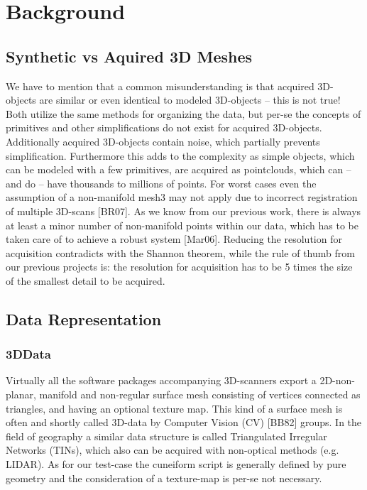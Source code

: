 \documentclass[openany]{book}
\begin{document}
\chapter{Background}
\section{Synthetic vs Aquired 3D Meshes}
We have to mention that a common misunderstanding is that acquired 3D-objects
are similar or even identical to modeled 3D-objects – this is not true! 
Both utilize the same methods for organizing the data, but per-se the concepts 
of primitives and other simplifications do not exist for acquired 3D-objects. 
Additionally acquired 3D-objects contain noise, which partially prevents 
simplification. Furthermore this adds to the complexity as simple objects, 
which can be modeled with a few primitives, are acquired as pointclouds, which 
can – and do – have thousands to millions of points. For worst cases even the 
assumption of a non-manifold mesh3 may not apply due to incorrect registration 
of multiple 3D-scans [BR07]. As we know from our previous work, there is always 
at least a minor number of non-manifold points within our data, which has to be 
taken care of to achieve a robust system [Mar06]. Reducing the resolution for 
acquisition contradicts with the Shannon theorem, while the rule of thumb from 
our previous projects is: the resolution for acquisition has to be 5 times the 
size of the smallest detail to be acquired.~\cite[p.~25]{Mara12}



\section{Data Representation}
\subsection{3DData}
Virtually all the software packages accompanying 3D-scanners export
a 2D-non-planar, manifold and non-regular surface mesh consisting of vertices 
connected as triangles, and having an optional texture map. This kind of a
surface mesh is often and shortly called 3D-data by Computer Vision (CV) [BB82]
groups. In the field of geography a similar data structure is called
Triangulated Irregular Networks (TINs), which also can be acquired with
non-optical methods (e.g. LIDAR). As for our test-case the cuneiform script is
generally defined by pure geometry and the consideration of a texture-map is
per-se not necessary.~\cite[p.~25]{Mara12}
\end{document}
